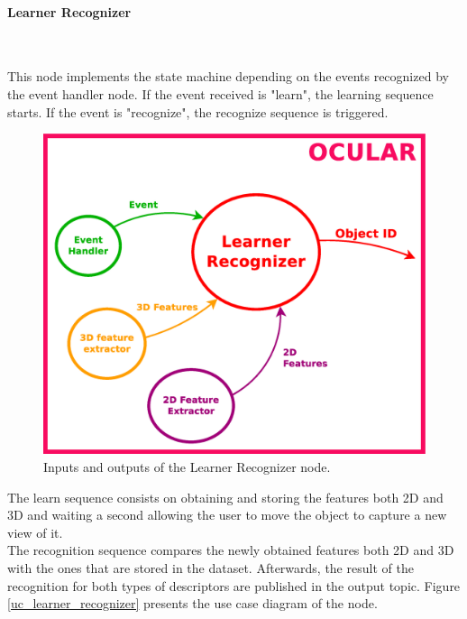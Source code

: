 
\paragraph{Learner Recognizer}\mbox{}\\
\label{learner_recognizer}

	This node implements the state machine depending on the events recognized by the event handler node. If the event received is "learn", the learning sequence starts. If the event is "recognize", the recognize sequence is triggered. 
	\\

		\begin{figure}[H]
			\begin{center}
			\includegraphics[width=0.5\linewidth]{img/diagrams/node_lr.eps}
			\caption[Learner Recognizer node I/O]{Inputs and outputs of the Learner Recognizer node.}		
			\label{node_lr}
			\end{center}
		\end{figure}

	The learn sequence consists on obtaining and storing the features both 2D and 3D and waiting a second allowing the user to move the object to capture a new view of it. 
	\\

	The recognition sequence compares the newly obtained features both 2D and 3D with the ones that are stored in the dataset. 
	Afterwards, the result of the recognition for both types of descriptors are published in the output topic. 
	Figure \ref{uc_learner_recognizer} presents the use case diagram of the node. 

